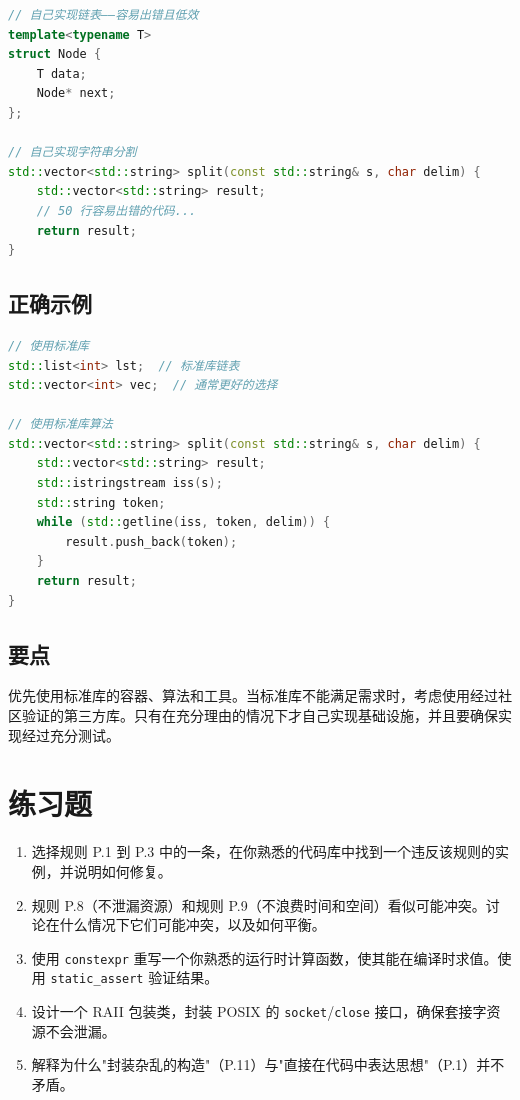 \begin{lstlisting}[language=C++]
// 自己实现链表——容易出错且低效
template<typename T>
struct Node {
    T data;
    Node* next;
};

// 自己实现字符串分割
std::vector<std::string> split(const std::string& s, char delim) {
    std::vector<std::string> result;
    // 50 行容易出错的代码...
    return result;
}
\end{lstlisting}

\subsection{正确示例}

\begin{lstlisting}[language=C++]
// 使用标准库
std::list<int> lst;  // 标准库链表
std::vector<int> vec;  // 通常更好的选择

// 使用标准库算法
std::vector<std::string> split(const std::string& s, char delim) {
    std::vector<std::string> result;
    std::istringstream iss(s);
    std::string token;
    while (std::getline(iss, token, delim)) {
        result.push_back(token);
    }
    return result;
}
\end{lstlisting}

\subsection{要点}
优先使用标准库的容器、算法和工具。当标准库不能满足需求时，考虑使用经过社区验证的第三方库。只有在充分理由的情况下才自己实现基础设施，并且要确保实现经过充分测试。

\section*{练习题}

\begin{enumerate}
  \item 选择规则 P.1 到 P.3 中的一条，在你熟悉的代码库中找到一个违反该规则的实例，并说明如何修复。
  \item 规则 P.8（不泄漏资源）和规则 P.9（不浪费时间和空间）看似可能冲突。讨论在什么情况下它们可能冲突，以及如何平衡。
  \item 使用 \texttt{constexpr} 重写一个你熟悉的运行时计算函数，使其能在编译时求值。使用 \texttt{static\_assert} 验证结果。
  \item 设计一个 RAII 包装类，封装 POSIX 的 \texttt{socket}/\allowbreak{}\texttt{close} 接口，确保套接字资源不会泄漏。
  \item 解释为什么"封装杂乱的构造"（P.11）与"直接在代码中表达思想"（P.1）并不矛盾。
\end{enumerate}


